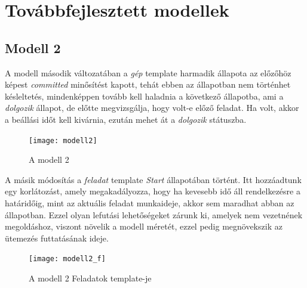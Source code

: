 \documentclass {report}
\begin{document}
\section{Továbbfejlesztett modellek}
\subsection{Modell 2}
A modell második változatában a \emph{gép} template harmadik állapota az előzőhöz képest \emph{committed} minősítést kapott, tehát ebben az állapotban nem történhet késleltetés, mindenképpen tovább kell haladnia a következő állapotba, ami a \emph{dolgozik} állapot, de előtte megvizsgálja, hogy volt-e előző feladat. Ha volt, akkor a beállási időt kell kivárnia, ezután mehet át a \emph{dolgozik} státuszba.\\
\begin{figure}[htpb]
\begin{center}
\texttt{[image: modell2]}
\caption{A modell 2}
\end{center}
\end{figure}
A másik módosítás a \emph{feladat} template \emph{Start} állapotában történt. Itt hozzáadtunk egy korlátozást, amely megakadályozza, hogy ha kevesebb idő áll rendelkezésre a határidőig, mint az aktuális feladat munkaideje, akkor sem maradhat abban az állapotban. Ezzel olyan lefutási lehetőségeket zárunk ki, amelyek nem vezetnének megoldáshoz, viszont növelik a modell méretét, ezzel pedig megnövekszik az ütemezés futtatásának ideje.
\begin{figure}[htpb]
\begin{center}
\texttt{[image: modell2\_f]}
\caption{A modell 2 Feladatok template-je}
\end{center}
\end{figure}
\end{document}
